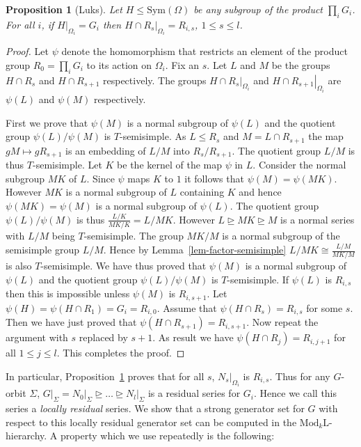 \documentclass[11pt]{madras}%
\newtheorem{proposition}[theorem]{Proposition}
\theoremstyle{remark}
\newcommand{\Sym}[1]{{\ensuremath{\mathrm{Sym}\left(#1\right)}}}
\newcommand{\ModkL}[1]{{\ensuremath{\mathrm{Mod}_{#1}\mathrm{L}}}}
\newcommand{\pr}[2]{{\ensuremath{\left.{#1}\right\vert_{#2}}}}
\begin{document}
\begin{proposition}[Luks]\label{prop-local-residual}
  Let $H \leq \Sym{\Omega}$ be any subgroup of the product $\prod_i
  G_i$. For all $i$, if $\pr{H}{\Omega_i} = G_i$ then $\pr{H \cap
    R_s}{\Omega_i} = R_{i,s}$, $1 \leq s \leq l$.
\end{proposition}
\begin{proof}
  Let $\psi$ denote the homomorphism that restricts an element of the
  product group $R_0 = \prod_i G_i$ to its action on $\Omega_i$.  Fix
  an $s$. Let $L$ and $M$ be the groups $H \cap R_s$ and $H \cap
  R_{s+1}$ respectively. The groups $\pr{H \cap R_s}{\Omega_i}$ and
  $\pr{H \cap R_{s+1}}{\Omega_i}$ are $\psi(L)$ and $\psi(M)$
  respectively.

  First we prove that $\psi(M)$ is a normal subgroup of $\psi(L)$ and
  the quotient group $\psi(L)/\psi(M)$ is $T$-semisimple.  As $L \leq
  R_s$ and $M = L \cap R_{s+1}$ the map $gM \mapsto g R_{s+1}$ is an
  embedding of $L/M$ into $R_s/R_{s+1}$.  The quotient group $L/M$ is
  thus $T$-semisimple. Let $K$ be the kernel of the map $\psi$ in $L$.
  Consider the normal subgroup $MK$ of $L$. Since $\psi$ maps $K$ to
  $1$ it follows that $\psi(M) = \psi(MK)$. However $MK$ is a normal
  subgroup of $L$ containing $K$ and hence $\psi(MK) = \psi(M)$ is a
  normal subgroup of $\psi(L)$. The quotient group $\psi(L)/\psi(M)$
  is thus $\frac{L/K}{MK/K} = L/MK$. However $L \unrhd MK \unrhd M$ is
  a normal series with $L/M$ being $T$-semisimple. The group $MK /M$
  is a normal subgroup of the semisimple group $L/M$.  Hence by
  Lemma~\ref{lem-factor-semisimple} $L/MK \cong \frac{L/M}{MK/M}$ is
  also $T$-semisimple. We have thus proved that $\psi(M)$ is a normal
  subgroup of $\psi(L)$ and the quotient group $\psi(L)/\psi(M)$ is
  $T$-semisimple. If $\psi(L)$ is $R_{i,s}$ then this is impossible
  unless $\psi(M)$ is $R_{i,s+1}$.  Let $\psi(H) =\psi(H \cap R_1) =
  G_i = R_{i,0}$. Assume that $\psi(H \cap R_s) = R_{i,s}$ for some
  $s$. Then we have just proved that $\psi(H \cap R_{s+1}) =
  R_{i,s+1}$. Now repeat the argument with $s$ replaced by $s+1$. As
  result we have $\psi(H \cap R_j) = R_{i,j+1}$ for all $1 \leq j \leq
  l$. This completes the proof.
\end{proof}

In particular, Proposition~\ref{prop-local-residual} proves that for
all $s$, $\pr{N_s}{\Omega_i}$ is $R_{i,s}$. Thus for any $G$-orbit
$\Sigma$, $\pr{G}{\Sigma} = \pr{N_0}{\Sigma} \unrhd \ldots \unrhd
\pr{N_l}{\Sigma}$ is a residual series for $G_i$. Hence we call this
series a \emph{locally residual}
series.  We show that a strong generator set for $G$ with respect to
this locally residual generator set can be computed in the
$\ModkL{k}$-hierarchy. A property which we use repeatedly is the
following:
\end{document}
